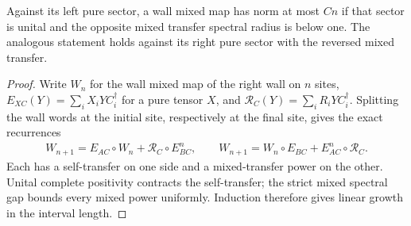 \begin{lemma}
    \label{lem:uncle_wall_mixed_linear_bounds}
    \leanok
    Against its left pure sector, a wall mixed map has norm at
    most $Cn$ if that sector is unital and the opposite mixed transfer
    spectral radius is below one. The analogous statement holds against
    its right pure sector with the reversed mixed transfer.
\end{lemma}
\begin{proof}
    \leanok
    Write $W_n$ for the wall mixed map of the right wall on $n$ sites,
    $E_{XC}(Y)=\sum_iX_iYC_i^\dagger$ for a pure tensor $X$, and
    $\mathcal R_C(Y)=\sum_iR_iYC_i^\dagger$. Splitting the wall words at
    the initial site, respectively at the final site, gives the exact
    recurrences
    \begin{align}
        W_{n+1}=E_{AC}\circ W_n+\mathcal R_C\circ E_{BC}^n,\qquad
        W_{n+1}=W_n\circ E_{BC}+E_{AC}^n\circ\mathcal R_C.
        \label{eq:uncle_wall_mixed_recurrences}
    \end{align}
    Each has a self-transfer on one side and a mixed-transfer power on
    the other. Unital complete positivity contracts the self-transfer;
    the strict mixed spectral gap bounds every mixed power uniformly.
    Induction therefore gives linear growth in the interval length.
\end{proof}

